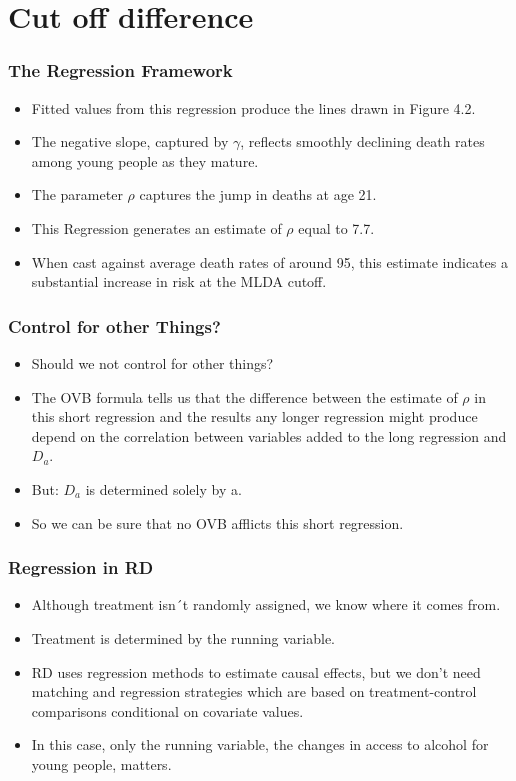 \documentclass{beamer}
\begin{document}
\section{Cut off difference} 
\begin{frame}
\frametitle{The Regression Framework}
\begin{itemize}
	\item Fitted values from this regression produce the lines drawn in Figure 4.2. 
	\item The negative slope, captured by $\gamma$, reflects smoothly declining death rates among young people as they mature. 
	\item The parameter $\rho$ captures the jump in deaths at age 21.
	\item This Regression generates an estimate of $\rho$ equal to 7.7. 
	\item When cast against average death rates of around 95, this estimate indicates a substantial increase in risk at the MLDA cutoff.
\end{itemize}
	
\end{frame}
\begin{frame}
\frametitle{Control for other Things?}

\begin{itemize}
	\item Should we not control for other things? 
	\item The OVB formula tells us that the difference between the estimate of $\rho$ in this short regression and the results any longer regression might produce depend on the correlation between variables added to the long regression and $D_a$. 
	\item But: $D_a$ is determined solely by a. 
	\item So we can be sure that no OVB afflicts this short regression.
\end{itemize}

\end{frame}
\begin{frame}
\frametitle{Regression in RD}
\begin{itemize}
	\item Although treatment isn´t randomly assigned, we know where it comes from. 
	\item Treatment is determined by the running variable.
	\item RD uses regression methods to estimate causal effects, but we don’t need matching and regression strategies which are based on treatment-control comparisons conditional on covariate values.
	\item In this case, only the running variable, the changes in access to alcohol for young people, matters.
\end{itemize}

\end{frame}
\end{document}
